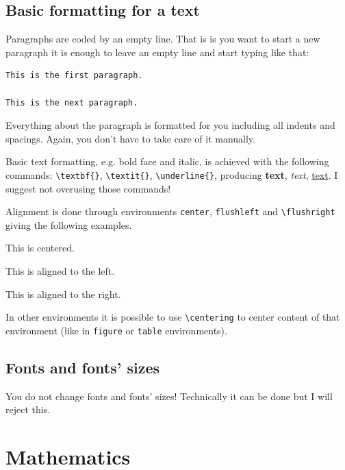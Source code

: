 \documentclass[english, twoside, 12pt, a4paper]{article}
\theoremstyle{definition}
\theoremstyle{plain}
\theoremstyle{remark}
\begin{document}
\subsection{Basic formatting for a text}

Paragraphs are coded by an empty line. That is is you want to start a new paragraph it is enough to leave an empty line and start typing like that:
\begin{verbatim}
This is the first paragraph.

This is the next paragraph.
\end{verbatim}

Everything about the paragraph is formatted for you including all indents and spacings. Again, you don't have to take care of it manually.

Basic text formatting, e.g. bold face and italic, is achieved with the following commands: \verb+\textbf{}+, \verb+\textit{}+, \verb+\underline{}+, producing \textbf{text}, \textit{text}, \underline{text}. I suggest not overusing those commands!

Alignment is done through environments \verb+center+, \verb+flushleft+ and \verb+\flushright+ giving the following examples.

\begin{center}
  This is centered.
\end{center}

\begin{flushleft}
  This is aligned to the left.
\end{flushleft}

\begin{flushright}
  This is aligned to the right. 
\end{flushright}

In other environments it is possible to use \verb+\centering+ to center content of that environment (like in \verb+figure+ or \verb+table+ environments).

\subsection{Fonts and fonts' sizes}

You do not change fonts and fonts' sizes! Technically it can be done but I will reject this.

\clearpage
\section{Mathematics}
\end{document}
